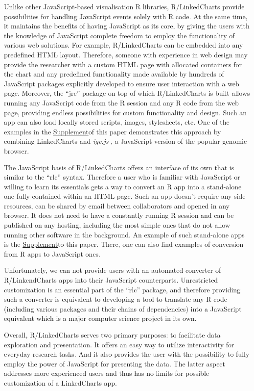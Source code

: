 \documentclass[twocolumn,10pt]{article}
\newcommand{\Supplement}{\href{https://anders-biostat.github.io/lc-paper/}{Supplement}}
\begin{document}
Unlike other JavaScript-based visualisation R libraries, R/LinkedCharts provide possibilities for handling JavaScript events solely with R code. At the same time, it maintains the benefits of having JavaScript as its core, by giving the users with the knowledge of JavaScript complete freedom to employ the functionality of various web solutions. For example, R/LinkedCharts can be embedded into any predefined HTML layout. Therefore, someone with experience in web design may provide the researcher with a custom HTML page with allocated containers for the chart and any predefined functionality made available by hundreds of JavaScript packages explicitly developed to ensure user interaction with a web page. Moreover, the ``jrc'' package on top of which R/LinkedCharts is built allows running any JavaScript code from the R session and any R code from the web page, providing endless possibilities for custom functionality and design. Such an app can also load locally stored scripts, images, stylesheets, etc. One of the examples in the \Supplement of this paper demonstrates this approach by combining LinkedCharts and \emph{igv.js} \citep{robinson_2023}, a JavaScript version of the popular genomic browser.

The JavaScript basis of R/LinkedCharts offers an interface of its own that is similar to the ``rlc'' syntax. Therefore a user who is familiar with JavaScript or willing to learn its essentials gets a way to convert an R app into a stand-alone one fully contained within an HTML page. Such an app doesn't require any side resources, can be shared by email between collaborators and opened in any browser. It does not need to have a constantly running R session and can be published on any hosting, including the most simple ones that do not allow running other software in the background. An example of such stand-alone apps is the \Supplement to this paper. There, one can also find examples of conversion from R apps to JavaScript ones.

Unfortunately, we can not provide users with an automated converter of R/LinkendCharts apps into their JavaScript counterparts. Unrestricted customization is an essential part of the ``rlc'' package, and therefore providing such a converter is equivalent to developing a tool to translate any R code (including various packages and their chains of dependencies) into a JavaScript equivalent which is a major computer science project in its own.

Overall, R/LinkedCharts serves two primary purposes: to facilitate data exploration and presentation. It offers an easy way to utilize interactivity for everyday research tasks. And it also provides the user with the possibility to fully employ the power of JavaScript for presenting the data. The latter aspect addresses more experienced users and thus has no limits for possible customization of a LinkedCharts app.
\end{document}
